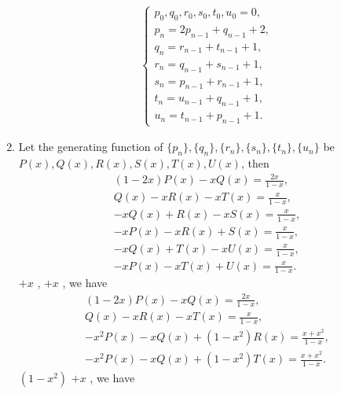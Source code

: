 \documentclass{../../cls/sig-alternate-05-2015}
\begin{document}
\begin{enumerate}[label=(\alph*)]
\begin{align}
    \begin{cases}
    p_0, q_0, r_0, s_0, t_0, u_0 = 0,\\
    p_n = 2p_{n - 1} + q_{n - 1} + 2,\\
    q_n = r_{n - 1} + t_{n - 1} + 1,\\
    r_n = q_{n - 1} + s_{n - 1} + 1,\\
    s_n = p_{n - 1} + r_{n - 1} + 1,\\
    t_n = u_{n - 1} + q_{n - 1} + 1,\\
    u_n = t_{n - 1} + p_{n - 1} + 1.
    \end{cases}
    \end{align}
    \item Let the generating function of $\{p_n\}, \{q_n\}, \{r_n\}, \{s_n\}, \{t_n\}, \{u_n\}$ be $P(x), Q(x), R(x), S(x), T(x), U(x)$, then \begin{subequations}
        \label{eq:6-2-c-09}
        \begin{align}
        (1 - 2x)P(x) - xQ(x) = \frac{2x}{1 - x},\\
        Q(x) - xR(x) - xT(x) = \frac{x}{1 - x},\\
        -xQ(x) + R(x) - xS(x) = \frac{x}{1 - x},\label{eq:6-2-c-09:c}\\
        -xP(x) - xR(x) + S(x) = \frac{x}{1 - x},\label{eq:6-2-c-09:d}\\
        -xQ(x) + T(x) - xU(x) = \frac{x}{1 - x},\label{eq:6-2-c-09:e}\\
        -xP(x) - xT(x) + U(x) = \frac{x}{1 - x}.\label{eq:6-2-c-09:f}
        \end{align}
    \end{subequations}
     $+ x$ ,
     $+ x$ ,
    we have
    \begin{subequations}
        \label{eq:6-2-c-10}
        \begin{align}
           (1 - 2x)P(x) - xQ(x) = \frac{2x}{1 - x},\\
           Q(x) - xR(x) - xT(x) = \frac{x}{1 - x},\label{eq:6-2-c-10:b}\\
           -x^2P(x) - xQ(x) + (1 - x^2)R(x) = \frac{x + x^2}{1 - x},\\
           -x^2P(x) - xQ(x) + (1 - x^2)T(x) = \frac{x + x^2}{1 - x}.\label{eq:6-2-c-10:e}
        \end{align}
    \end{subequations}
    $(1 - x^2)$ $+ x$ ,
    we have

\end{enumerate}
\end{document}
